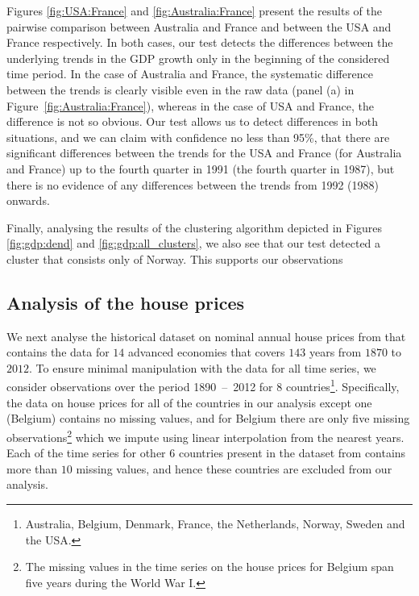 \documentclass[a4paper,12pt]{article}
\begin{document}
Figures \ref{fig:USA:France} and \ref{fig:Australia:France} present the results of the pairwise comparison between Australia and France and between the USA and France respectively. In both cases, our test detects the differences between the underlying trends in the GDP growth only in the beginning of the considered time period. In the case of Australia and France, the systematic difference between the trends is clearly visible even in the raw data (panel (a) in Figure~\ref{fig:Australia:France}), whereas in the case of USA and France, the difference is not so obvious. Our test allows us to detect differences in both situations, and we can claim with confidence no less than 95\%, that there are significant differences between the trends for the USA and France (for Australia and France) up to the fourth quarter in 1991 (the fourth quarter in 1987), but there is no evidence of any differences between the trends from 1992 (1988) onwards.

Finally, analysing the results of the clustering algorithm depicted in Figures \ref{fig:gdp:dend} and \ref{fig:gdp:all_clusters}, we also see that our test detected a cluster that consists only of Norway. This supports our observations


\subsection{Analysis of the house prices}\label{subsec:app:hp}

We next analyse the historical dataset on nominal annual house prices from \linebreak\cite{Knoll2017} that contains the data for $14$ advanced economies that covers $143$ years from $1870$ to $2012$.  To ensure minimal manipulation with the data for all time series, we consider observations over the period 1890~--~2012 for 8 countries\footnote{Australia, Belgium, Denmark, France, the Netherlands, Norway, Sweden and the USA.}. Specifically, the data on house prices for all of the countries in our analysis except one (Belgium) contains no missing values, and for Belgium there are only five missing observations\footnote{The missing values in the time series on the house prices for Belgium span five years during the World War I.} which we impute using linear interpolation from the nearest years. Each of the time series for other $6$ countries present in the dataset from \cite{Knoll2017} contains more than $10$ missing values, and hence these countries are excluded from our analysis.
\end{document}

